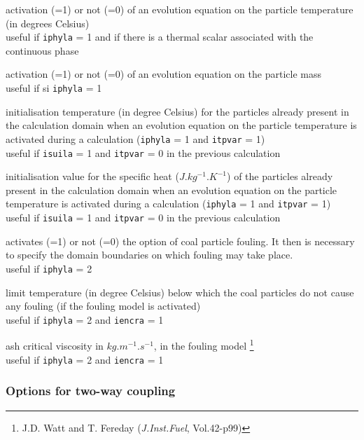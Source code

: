 {activation (=1) or not (=0) of an evolution equation on the particle
temperature (in degrees Celsius)\\
useful if \texttt{iphyla} = 1 and if there is a thermal scalar associated with
the continuous phase}

{activation (=1) or not (=0) of an evolution equation on the
particle mass\\
useful if si \texttt{iphyla} = 1}

{initialisation temperature (in degree Celsius) for the particles already
present in the calculation domain when an evolution equation on
the particle temperature is activated during a calculation (\texttt{iphyla} =
1 and \texttt{itpvar} = 1)\\
useful if \texttt{isuila} = 1 and \texttt{itpvar} = 0 in the previous
calculation}

{initialisation value for the specific heat ($J.kg^{-1}.K^{-1}$) of the
particles already present in the calculation domain when an evolution equation
on the particle temperature is activated during a calculation
(\texttt{iphyla} = 1 and \texttt{itpvar} = 1)\\
useful if \texttt{isuila} = 1 and \texttt{itpvar} = 0 in the previous calculation}

{activates (=1) or not (=0) the option of coal particle
fouling. It then is necessary to specify the domain boundaries
on which fouling may take place.\\
useful if \texttt{iphyla} = 2}

{limit temperature (in degree Celsius) below which the coal particles do
not cause any fouling (if the fouling model is activated)\\
useful if \texttt{iphyla} = 2 and \texttt{iencra} = 1}

{ash critical viscosity in $kg.m^{-1}.s^{-1}$, in the fouling model
\footnote{J.D. Watt
and T. Fereday (\textit{J.Inst.Fuel}, Vol.42-p99)}\\
useful if \texttt{iphyla} = 2 and \texttt{iencra} = 1}

\subsubsection{Options for two-way coupling}

